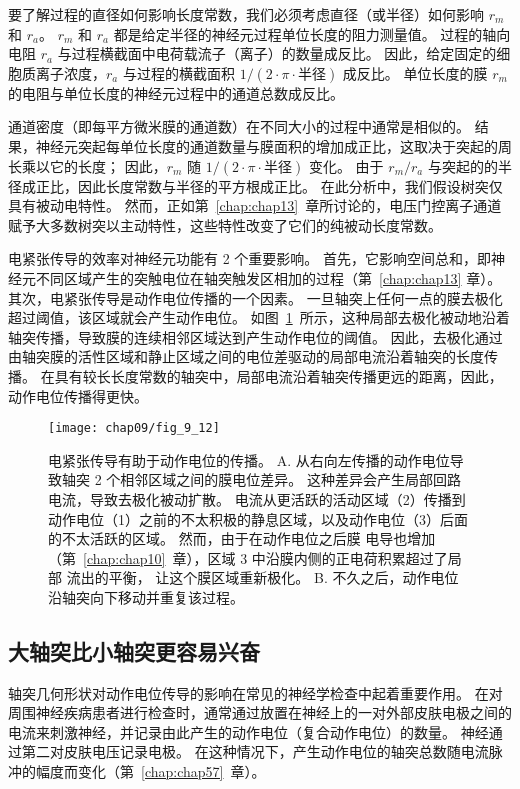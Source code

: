 要了解过程的直径如何影响长度常数，我们必须考虑直径（或半径）如何影响 $r_m$ 和 $r_a$。
$r_m$ 和 $r_a$ 都是给定半径的神经元过程单位长度的阻力测量值。
过程的轴向电阻 $r_a$ 与过程横截面中电荷载流子（离子）的数量成反比。 
因此，给定固定的细胞质离子浓度，$r_a$ 与过程的横截面积 $1 / (2 \cdot \pi \cdot \texttt{半径})$ 成反比。
单位长度的膜 $r_m$ 的电阻与单位长度的神经元过程中的通道总数成反比。


通道密度（即每平方微米膜的通道数）在不同大小的过程中通常是相似的。
结果，神经元突起每单位长度的通道数量与膜面积的增加成正比，这取决于突起的周长乘以它的长度；
因此，$r_m$ 随 $1 / (2 \cdot \pi \cdot \texttt{半径})$ 变化。
由于 $r_m/r_a$ 与突起的的半径成正比，因此长度常数与半径的平方根成正比。
在此分析中，我们假设树突仅具有被动电特性。
然而，正如第~\ref{chap:chap13}~章所讨论的，电压门控离子通道赋予大多数树突以主动特性，这些特性改变了它们的纯被动长度常数。


电紧张传导的效率对神经元功能有 2 个重要影响。
首先，它影响空间总和，即神经元不同区域产生的突触电位在轴突触发区相加的过程（第~\ref{chap:chap13} 章）。
其次，电紧张传导是动作电位传播的一个因素。
一旦轴突上任何一点的膜去极化超过阈值，该区域就会产生动作电位。
如图~\ref{fig:9_12}~所示，这种局部去极化被动地沿着轴突传播，导致膜的连续相邻区域达到产生动作电位的阈值。
因此，去极化通过由轴突膜的活性区域和静止区域之间的电位差驱动的局部电流沿着轴突的长度传播。
在具有较长长度常数的轴突中，局部电流沿着轴突传播更远的距离，因此，动作电位传播得更快。


\begin{figure}[htbp]
	\centering
	\texttt{[image: chap09/fig\_9\_12]}
	\caption{电紧张传导有助于动作电位的传播。
		A. 从右向左传播的动作电位导致轴突 2 个相邻区域之间的膜电位差异。
		这种差异会产生局部回路电流，导致去极化被动扩散。
		电流从更活跃的活动区域（2）传播到动作电位（1）之前的不太积极的静息区域，以及动作电位（3）后面的不太活跃的区域。
		然而，由于在动作电位之后膜  电导也增加（第~\ref{chap:chap10}~章），区域 3 中沿膜内侧的正电荷积累超过了局部  流出的平衡， 让这个膜区域重新极化。
		B. 不久之后，动作电位沿轴突向下移动并重复该过程。}
	\label{fig:9_12}
\end{figure}



\subsection{大轴突比小轴突更容易兴奋}

轴突几何形状对动作电位传导的影响在常见的神经学检查中起着重要作用。
在对周围神经疾病患者进行检查时，通常通过放置在神经上的一对外部皮肤电极之间的电流来刺激神经，并记录由此产生的动作电位（复合动作电位）的数量。
神经通过第二对皮肤电压记录电极。
在这种情况下，产生动作电位的轴突总数随电流脉冲的幅度而变化（第~\ref{chap:chap57}~章）。


